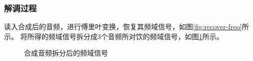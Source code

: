 \documentclass{article}
\begin{document}
\subsubsection{解调过程}
读入合成后的音频，进行傅里叶变换，恢复其频域信号，如图\ref{fig:recover-freq}所示。
将所得的频域信号拆分成3个音频所对饮的频域信号，如图\ref{fig:recover-freq-split}所示。
\begin{figure}[htbp]
\centering
{}
\caption{合成音频拆分后的频域信号}
\label{fig:recover-freq-split}
\end{figure}
\end{document}
